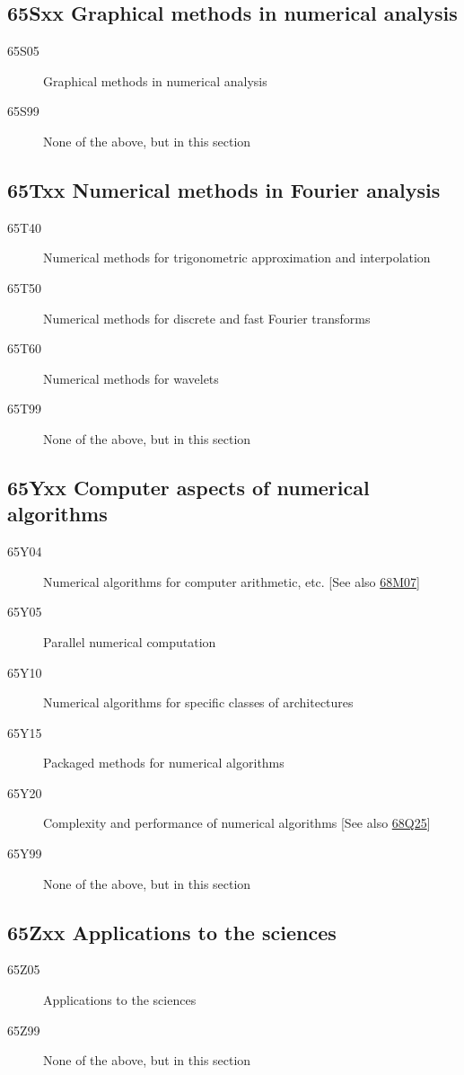 \documentclass[letterpaper]{article}
\begin{document}
\subsection*{65Sxx  Graphical methods in numerical analysis }\label{65Sxx}
\begin{description}  
\item [65S05]\label{65S05} Graphical methods in numerical analysis
\item [65S99]\label{65S99} None of the above, but in this section
\end{description}
\subsection*{65Txx  Numerical methods in Fourier analysis }\label{65Txx}
\begin{description}  
\item [65T40]\label{65T40} Numerical methods for trigonometric approximation and interpolation
\item [65T50]\label{65T50} Numerical methods for discrete and fast Fourier transforms
\item [65T60]\label{65T60} Numerical methods for wavelets
\item [65T99]\label{65T99} None of the above, but in this section
\end{description}
\subsection*{65Yxx  Computer aspects of numerical algorithms }\label{65Yxx}
\begin{description}  
\item [65Y04]\label{65Y04} Numerical algorithms for computer arithmetic, etc. [See also \hyperref[68M07]{68M07}]
\item [65Y05]\label{65Y05} Parallel numerical computation
\item [65Y10]\label{65Y10} Numerical algorithms for specific classes of architectures
\item [65Y15]\label{65Y15} Packaged methods for numerical algorithms
\item [65Y20]\label{65Y20} Complexity and performance of numerical algorithms [See also \hyperref[68Q25]{68Q25}]
\item [65Y99]\label{65Y99} None of the above, but in this section
\end{description}
\subsection*{65Zxx   Applications to the sciences }\label{65Zxx}
\begin{description}  
\item [65Z05]\label{65Z05}  Applications to the sciences
\item [65Z99]\label{65Z99} None of the above, but in this section
\end{description}
\end{document}

